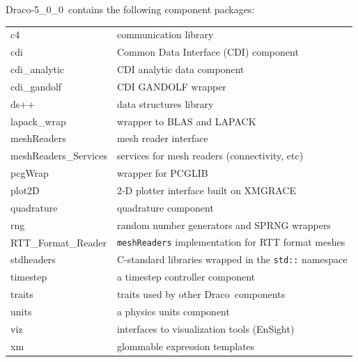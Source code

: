 \documentclass[note]{ResearchNote_pdf}
\newcommand{\draco}{Draco}
\newcommand{\dracor}{\draco-5\_0\_0}
\newcommand{\tableText}[1]{{\raggedright #1}}
\begin{document}
\dracor\ contains the following component packages:
\begin{center}
  \footnotesize
  \begin{tabular}{lp{3.0in}}
    \hline\hline 

    c4 & \tableText{communication library} \\
    cdi & \tableText{Common Data Interface (CDI) component} \\
    cdi\_analytic & \tableText{CDI analytic data component} \\
    cdi\_gandolf & \tableText{CDI GANDOLF wrapper} \\
    ds++ & \tableText{data structures library} \\
    lapack\_wrap & \tableText{wrapper to BLAS and LAPACK} \\
    meshReaders & \tableText{mesh reader interface} \\
    meshReaders\_Services & \tableText{services for mesh readers
      (connectivity, etc)} \\ 
    pcgWrap & \tableText{wrapper for PCGLIB} \\
    plot2D & \tableText{2-D plotter interface built on XMGRACE} \\
    quadrature & \tableText{quadrature component} \\
    rng & \tableText{random number generators and SPRNG wrappers} \\
    RTT\_Format\_Reader & \tableText{\texttt{meshReaders}
      implementation for RTT format meshes} \\
    stdheaders & \tableText{C-standard libraries wrapped in the
      \texttt{std::} namespace} \\ 
    timestep & \tableText{a timestep controller component} \\
    traits & \tableText{traits used by other \draco\ components} \\
    units & \tableText{a physics units component} \\
    viz & \tableText{interfaces to visualization tools (EnSight)} \\
    xm & \tableText{glommable expression templates} \\  

    \hline\hline 
  \end{tabular}
\end{center}
\end{document}
